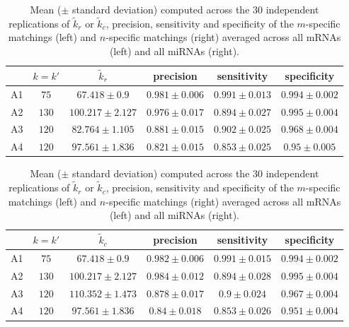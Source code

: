 \begin{table}
  \space{3cm}
  
      \begin{minipage}{.5\linewidth}
    \tiny{
      \centering
 \begin{tabular}{c|c|c|c|c|c}
 & $k=k'$ & $\tilde{k}_r$ & precision & sensitivity & specificity\\
 \hline
A1  &$ 75 $&$ 67.418 \pm 0.9 $&$ 0.981 \pm 0.006 $&$ 0.991 \pm 0.013 $&$ 0.994 \pm 0.002 $\\
A2 &$ 130 $&$ 100.217 \pm 2.127 $&$ 0.976 \pm 0.017 $&$ 0.894 \pm 0.027 $&$ 0.995 \pm 0.004 $\\
A3 &$ 120 $&$ 82.764 \pm 1.105 $&$ 0.881 \pm 0.015 $&$ 0.902 \pm 0.025 $&$ 0.968 \pm 0.004 $\\
A4 &$ 120 $&$ 97.561 \pm 1.836 $&$ 0.821 \pm 0.015 $&$ 0.853 \pm 0.025 $&$ 0.95 \pm 0.005 $\\
\hline
\end{tabular}
		}
    \end{minipage}%
    \begin{minipage}{.5\linewidth}
    \tiny{
      \centering
      \begin{tabular}{c|c|c|c|c|c}
 & $k=k'$ & $\tilde{k}_c$ & precision & sensitivity & specificity\\
\hline
A1 &$ 75 $&$ 67.418 \pm 0.9 $&$ 0.982 \pm 0.006 $&$ 0.991 \pm 0.015 $&$ 0.994 \pm 0.002 $\\
A2 &$ 130 $&$ 100.217 \pm 2.127 $&$ 0.984 \pm 0.012 $&$ 0.894 \pm 0.028 $&$ 0.995 \pm 0.004 $\\
A3 &$ 120 $&$ 110.352 \pm 1.473 $&$ 0.878 \pm 0.017 $&$ 0.9 \pm 0.024 $&$ 0.967 \pm 0.004 $\\
A4 &$ 120 $&$ 97.561 \pm 1.836 $&$ 0.84 \pm 0.018 $&$ 0.853 \pm 0.026 $&$ 0.951 \pm 0.004 $\\
\hline
\end{tabular}
}
    \end{minipage} 
\caption{Mean  ($\pm$   standard  deviation)  computed  across   the  30
  independent  replications   of  $\tilde{k}_{r}$   or  $\tilde{k}_{c}$,
  precision, sensitivity  and specificity of the  $m$-specific matchings
  (left) and  $n$-specific matchings  (right) averaged across  all mRNAs
  (left) and all miRNAs (right).  \label{tab:simulA:results:matching} }

\end{table}

